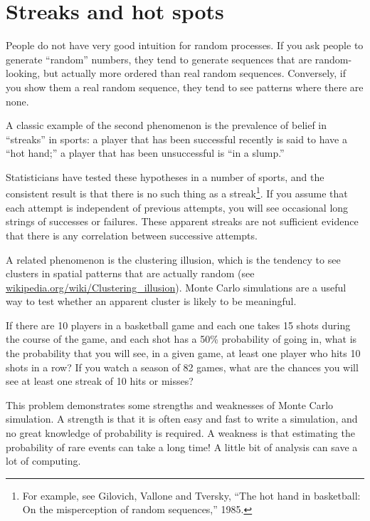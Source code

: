 \documentclass[10pt]{book}
\begin{document}
\section{Streaks and hot spots}

People do not have very good intuition for random processes.
If you ask people to generate ``random'' numbers,
they tend to generate sequences that are random-looking, but
actually more ordered than real random sequences.  Conversely,
if you show them a real random sequence, they tend to see
patterns where there are none.

A classic example of the second phenomenon is the prevalence
of belief in ``streaks'' in sports: a player that has been
successful recently is said to have a ``hot hand;'' a player
that has been unsuccessful is ``in a slump.''

Statisticians have tested these hypotheses in a number of sports, and
the consistent result is that there is no such thing as a
streak\footnote{For example, see Gilovich, Vallone and Tversky, ``The
  hot hand in basketball: On the misperception of random sequences,''
  1985.}.  If you assume that each attempt is independent of previous
attempts, you will see occasional long strings of successes or
failures.  These apparent streaks are not sufficient evidence that
there is any correlation between successive attempts.

A related phenomenon is the clustering illusion, which is the
tendency to see clusters in spatial patterns that are actually
random (see \url{wikipedia.org/wiki/Clustering_illusion}).
Monte Carlo simulations are a useful way to test whether an apparent
cluster is likely to be meaningful.

\begin{ex}

If there are 10 players in a basketball game and each one takes
15 shots during the course of the game, and each shot has a
50\% probability of going in, what is the probability that 
you will see, in a given game, at least one player who
hits 10 shots in a row?  If you watch a season of 82 games,
what are the chances you will see at least one streak of
10 hits or misses?

This problem demonstrates some strengths and weaknesses of Monte
Carlo simulation.  A strength is that it is often easy and fast
to write a simulation, and no great knowledge of probability is
required.  A weakness is that estimating the probability of
rare events can take a long time!  A little bit of analysis can
save a lot of computing.

\end{ex}
\end{document}
